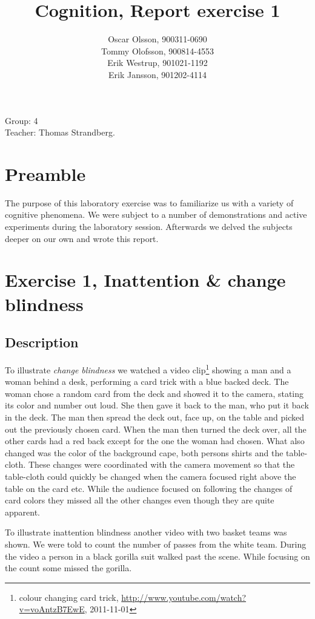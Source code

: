 \documentclass[10pt, a4paper]{article}
\title{Cognition, Report exercise 1}
\date{}
\author{Oscar Olsson, 900311-0690\\ Tommy Olofsson, 900814-4553\\
	Erik Westrup, 901021-1192\\ Erik Jansson, 901202-4114}
\begin{document}
\maketitle
\begin{center}
Group: 4 \\
Teacher: Thomas Strandberg.
\end{center}
\newpage

\section{Preamble}
The purpose of this laboratory exercise was to familiarize us with a variety of cognitive phenomena. We were subject to a number of demonstrations and active experiments during the laboratory session. Afterwards we delved the subjects deeper on our own and wrote this report.

\section{Exercise 1, Inattention \& change blindness}
\subsection{Description}
To illustrate \emph{change blindness} we watched a video clip\footnote{colour changing card trick, \url{http://www.youtube.com/watch?v=voAntzB7EwE}, 2011-11-01} showing a man and a woman behind a desk, performing a card trick with a blue backed deck. The woman chose a random card from the deck and showed it to the camera, stating its color and number out loud. She then gave it back to the man, who put it back in the deck. The man then spread the deck out, face up, on the table and picked out the previously chosen card. When the man then turned the deck over, all the other cards had a red back except for the one the woman had chosen. What also changed was the color of the background cape, both persons shirts and the table-cloth. These changes were coordinated with the camera movement so that the table-cloth could quickly be changed when the camera focused right above the table on the card etc. While the audience focused on following the changes of card colors they missed all the other changes even though they are quite apparent.

To illustrate inattention blindness another video with two basket teams was shown. We were told to count the number of passes from the white team. During the video a person in a black gorilla suit walked past the scene. While focusing on the count some missed the gorilla.
\end{document}
